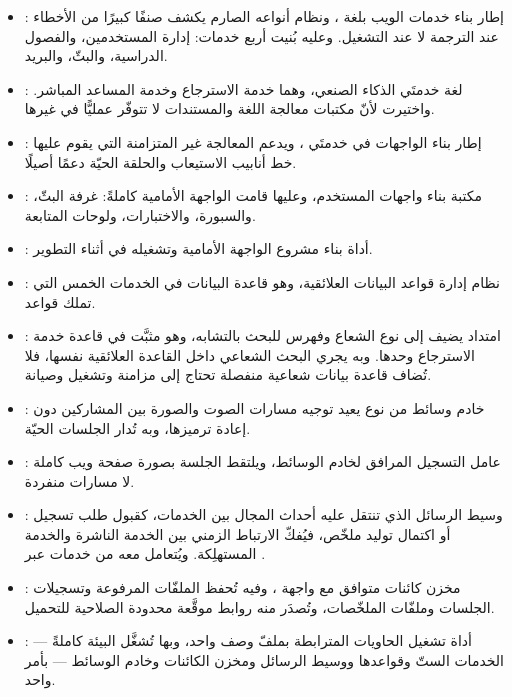 \begin{itemize}
  \item \textbf{}: إطار بناء خدمات الويب بلغة ، ونظام أنواعه الصارم يكشف صنفًا كبيرًا من الأخطاء عند الترجمة لا عند التشغيل. وعليه بُنيت أربع خدمات: إدارة المستخدمين، والفصول الدراسية، والبثّ، والبريد.

  \item \textbf{}: لغة خدمتَي الذكاء الصنعي، وهما خدمة الاسترجاع وخدمة المساعد المباشر. واختيرت لأنّ مكتبات معالجة اللغة والمستندات لا تتوفّر عمليًّا في غيرها.

  \item \textbf{}: إطار بناء الواجهات في خدمتَي ، ويدعم المعالجة غير المتزامنة التي يقوم عليها خط أنابيب الاستيعاب والحلقة الحيّة دعمًا أصيلًا.

  \item \textbf{}: مكتبة بناء واجهات المستخدم، وعليها قامت الواجهة الأمامية كاملةً: غرفة البثّ، والسبورة، والاختبارات، ولوحات المتابعة.

  \item \textbf{}: أداة بناء مشروع الواجهة الأمامية وتشغيله في أثناء التطوير.

  \item \textbf{}: نظام إدارة قواعد البيانات العلائقية، وهو قاعدة البيانات في الخدمات الخمس التي تملك قواعد.

  \item \textbf{}: امتداد يضيف إلى  نوع الشعاع وفهرس  للبحث بالتشابه، وهو مثبَّت في قاعدة خدمة الاسترجاع وحدها. وبه يجري البحث الشعاعي داخل القاعدة العلائقية نفسها، فلا تُضاف قاعدة بيانات شعاعية منفصلة تحتاج إلى مزامنة وتشغيل وصيانة.

  \item \textbf{}: خادم وسائط من نوع  يعيد توجيه مسارات الصوت والصورة بين المشاركين دون إعادة ترميزها، وبه تُدار الجلسات الحيّة.

  \item \textbf{}: عامل التسجيل المرافق لخادم الوسائط، ويلتقط الجلسة بصورة صفحة ويب كاملة لا مسارات منفردة.

  \item \textbf{}: وسيط الرسائل الذي تنتقل عليه أحداث المجال بين الخدمات، كقبول طلب تسجيل أو اكتمال توليد ملخّص، فيُفكّ الارتباط الزمني بين الخدمة الناشرة والخدمة المستهلِكة. ويُتعامل معه من خدمات  عبر .

  \item \textbf{}: مخزن كائنات متوافق مع واجهة ، وفيه تُحفظ الملفّات المرفوعة وتسجيلات الجلسات وملفّات الملخّصات، وتُصدَر منه روابط موقَّعة محدودة الصلاحية للتحميل.

  \item \textbf{}: أداة تشغيل الحاويات المترابطة بملفّ وصف واحد، وبها تُشغَّل البيئة كاملةً — الخدمات الستّ وقواعدها ووسيط الرسائل ومخزن الكائنات وخادم الوسائط — بأمر واحد.
\end{itemize}


